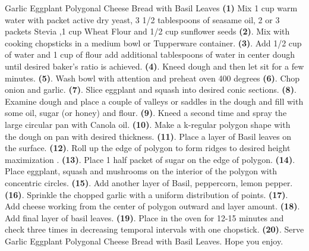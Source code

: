 \documentclass{recipecard}
\begin{document}
\vspace{8pt}


\begin{recipe}{Garlic Eggplant Polygonal Cheese Bread with Basil Leaves}{} \textbf{(1)} Mix 1 cup warm water with packet active dry yeast, 3 1/2 tablespoons of seasame oil, 2 or 3 packets Stevia ,1 cup Wheat Flour and 1/2 cup sunflower seeds \textbf{(2)}. Mix with cooking chopsticks in a medium bowl or Tupperware container.\textbf{ (3)}. Add 1/2 cup of water and 1 cup of flour add additional tablespoons of water in center dough until desired baker's ratio is achieved. \textbf{(4)}. Kneed dough and then let sit for a few minutes. \textbf{(5)}. Wash bowl with attention and preheat oven 400 degrees \textbf{(6)}. Chop onion and garlic. \textbf{(7)}. Slice eggplant and squash into desired conic sections. \textbf{(8)}. Examine dough and place a couple of valleys or saddles in the dough and fill with some oil, sugar (or honey) and flour. \textbf{(9)}. Kneed a second time and spray the large circular pan with Canola oil. \textbf{(10)}. Make a k-regular polygon shape with the dough on pan with desired thickness. \textbf{(11)}. Place a layer of Basil leaves on the surface.\textbf{ (12)}. Roll up the edge of polygon to form ridges to desired height maximization .\textbf{ (13)}. Place 1 half packet of sugar on the edge of polygon. \textbf{(14)}. Place eggplant, squash and mushrooms on the interior of the polygon with concentric circles.\textbf{ (15)}. Add another layer of Basil, peppercorn, lemon pepper. \textbf{(16)}. Sprinkle the chopped garlic with a uniform distribution of points.\textbf{ (17)}. Add cheese working from the center of polygon outward and layer amount.\textbf{ (18)}. Add final layer of basil leaves. \textbf{(19)}. Place in the oven for 12-15 minutes and check three times in decreasing temporal intervals with one chopstick.\textbf{ (20)}. Serve Garlic Eggplant Polygonal Cheese Bread with Basil Leaves. Hope you enjoy. 
\end{recipe}
\end{document}
